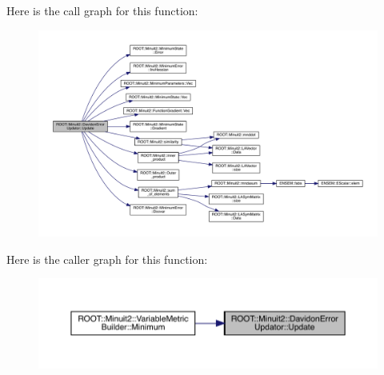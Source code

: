 Here is the call graph for this function\+:
\nopagebreak
\begin{figure}[H]
\begin{center}
\leavevmode
\includegraphics[width=350pt]{d1/d0a/classROOT_1_1Minuit2_1_1DavidonErrorUpdator_afad671aa523cbd9f17af376c51c3ce97_cgraph}
\end{center}
\end{figure}
Here is the caller graph for this function\+:
\nopagebreak
\begin{figure}[H]
\begin{center}
\leavevmode
\includegraphics[width=350pt]{d1/d0a/classROOT_1_1Minuit2_1_1DavidonErrorUpdator_afad671aa523cbd9f17af376c51c3ce97_icgraph}
\end{center}
\end{figure}
\mbox{\label{classROOT_1_1Minuit2_1_1DavidonErrorUpdator_aae088602f78dc3bee91f7ce2534311e9}} 
